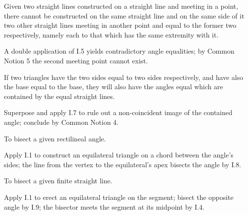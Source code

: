 \begin{claim}
\label{prop:I.7}
Given two straight lines constructed on a straight line and meeting in
a point, there cannot be constructed on the same straight line and on
the same side of it two other straight lines meeting in another point
and equal to the former two respectively, namely each to that which
has the same extremity with it.
\end{claim}
\begin{evidence}[Proof of I.7]
\label{ev:I.7}
A double application of I.5 yields contradictory angle equalities; by
Common Notion 5 the second meeting point cannot exist.
\end{evidence}

\begin{claim}
\label{prop:I.8}
If two triangles have the two sides equal to two sides respectively,
and have also the base equal to the base, they will also have the
angles equal which are contained by the equal straight lines.
\end{claim}
\begin{evidence}[Proof of I.8]
\label{ev:I.8}
Superpose and apply I.7 to rule out a non-coincident image of the
contained angle; conclude by Common Notion 4.
\end{evidence}

\begin{claim}
\label{prop:I.9}
To bisect a given rectilineal angle.
\end{claim}
\begin{evidence}[Proof of I.9]
\label{ev:I.9}
Apply I.1 to construct an equilateral triangle on a chord between the
angle's sides; the line from the vertex to the equilateral's apex
bisects the angle by I.8.
\end{evidence}

\begin{claim}
\label{prop:I.10}
To bisect a given finite straight line.
\end{claim}
\begin{evidence}[Proof of I.10]
\label{ev:I.10}
Apply I.1 to erect an equilateral triangle on the segment; bisect the
opposite angle by I.9; the bisector meets the segment at its midpoint
by I.4.
\end{evidence}

